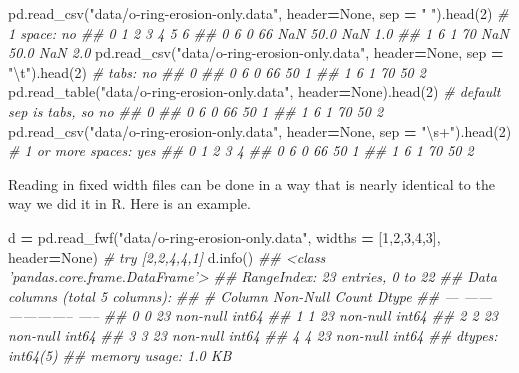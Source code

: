 \documentclass[12pt,krantz2]{krantz}
\makeatletter
\newenvironment{Shaded}{\begin{snugshade}}{\end{snugshade}}
\newcommand{\CharTok}[1]{\textcolor[rgb]{0.5,0.5,0.5}{#1}}
\newcommand{\CommentTok}[1]{\textcolor[rgb]{0.37,0.37,0.37}{\textit{#1}}}
\newcommand{\DecValTok}[1]{\textcolor[rgb]{0.06,0.06,0.06}{#1}}
\newcommand{\NormalTok}[1]{#1}
\newcommand{\OperatorTok}[1]{\textcolor[rgb]{0.43,0.43,0.43}{\textbf{#1}}}
\newcommand{\StringTok}[1]{\textcolor[rgb]{0.5,0.5,0.5}{#1}}
\newcommand{\VariableTok}[1]{\textcolor[rgb]{0,0,0}{#1}}
\newenvironment{kframe}{%
\medskip{}
\setlength{\fboxsep}{.8em}
 \def\at@end@of@kframe{}%
 \ifinner\ifhmode%
  \def\at@end@of@kframe{\end{minipage}}%
  \begin{minipage}{\columnwidth}%
 \fi\fi%
 \def\FrameCommand##1{\hskip\@totalleftmargin \hskip-\fboxsep
 \colorbox{shadecolor}{##1}\hskip-\fboxsep
     \hskip-\linewidth \hskip-\@totalleftmargin \hskip\columnwidth}%
 \MakeFramed {\advance\hsize-\width
   \@totalleftmargin\z@ \linewidth\hsize
   \@setminipage}}%
 {\par\unskip\endMakeFramed%
 \at@end@of@kframe}
\renewenvironment{Shaded}{\begin{kframe}}{\end{kframe}}
\makeatother
\begin{document}
\begin{Shaded}
\begin{Highlighting}[]
\NormalTok{pd.read_csv(}\StringTok{"data/o-ring-erosion-only.data"}\NormalTok{, }
\NormalTok{              header}\OperatorTok{=}\VariableTok{None}\NormalTok{, sep }\OperatorTok{=} \StringTok{" "}\NormalTok{).head(}\DecValTok{2}\NormalTok{) }\CommentTok{# 1 space: no}
\CommentTok{##    0  1   2   3     4   5    6}
\CommentTok{## 0  6  0  66 NaN  50.0 NaN  1.0}
\CommentTok{## 1  6  1  70 NaN  50.0 NaN  2.0}
\NormalTok{pd.read_csv(}\StringTok{"data/o-ring-erosion-only.data"}\NormalTok{, }
\NormalTok{              header}\OperatorTok{=}\VariableTok{None}\NormalTok{, sep }\OperatorTok{=} \StringTok{"}\CharTok{\textbackslash{}t}\StringTok{"}\NormalTok{).head(}\DecValTok{2}\NormalTok{) }\CommentTok{# tabs: no}
\CommentTok{##                0}
\CommentTok{## 0  6 0 66  50  1}
\CommentTok{## 1  6 1 70  50  2}
\NormalTok{pd.read_table(}\StringTok{"data/o-ring-erosion-only.data"}\NormalTok{, }
\NormalTok{              header}\OperatorTok{=}\VariableTok{None}\NormalTok{).head(}\DecValTok{2}\NormalTok{) }\CommentTok{# default sep is tabs, so no}
\CommentTok{##                0}
\CommentTok{## 0  6 0 66  50  1}
\CommentTok{## 1  6 1 70  50  2}
\NormalTok{pd.read_csv(}\StringTok{"data/o-ring-erosion-only.data"}\NormalTok{, }
\NormalTok{              header}\OperatorTok{=}\VariableTok{None}\NormalTok{, sep }\OperatorTok{=} \StringTok{"\textbackslash{}s+"}\NormalTok{).head(}\DecValTok{2}\NormalTok{) }\CommentTok{# 1 or more spaces: yes}
\CommentTok{##    0  1   2   3  4}
\CommentTok{## 0  6  0  66  50  1}
\CommentTok{## 1  6  1  70  50  2}
\end{Highlighting}
\end{Shaded}

Reading in fixed width files can be done in a way that is nearly identical to the way we did it in R. Here is an example.

\begin{Shaded}
\begin{Highlighting}[]
\NormalTok{d }\OperatorTok{=}\NormalTok{ pd.read_fwf(}\StringTok{"data/o-ring-erosion-only.data"}\NormalTok{, }
\NormalTok{                widths }\OperatorTok{=}\NormalTok{ [}\DecValTok{1}\NormalTok{,}\DecValTok{2}\NormalTok{,}\DecValTok{3}\NormalTok{,}\DecValTok{4}\NormalTok{,}\DecValTok{3}\NormalTok{], header}\OperatorTok{=}\VariableTok{None}\NormalTok{) }\CommentTok{# try [2,2,4,4,1]}
\NormalTok{d.info()}
\CommentTok{## <class 'pandas.core.frame.DataFrame'>}
\CommentTok{## RangeIndex: 23 entries, 0 to 22}
\CommentTok{## Data columns (total 5 columns):}
\CommentTok{##  #   Column  Non-Null Count  Dtype}
\CommentTok{## ---  ------  --------------  -----}
\CommentTok{##  0   0       23 non-null     int64}
\CommentTok{##  1   1       23 non-null     int64}
\CommentTok{##  2   2       23 non-null     int64}
\CommentTok{##  3   3       23 non-null     int64}
\CommentTok{##  4   4       23 non-null     int64}
\CommentTok{## dtypes: int64(5)}
\CommentTok{## memory usage: 1.0 KB}
\end{Highlighting}
\end{Shaded}
\end{document}
